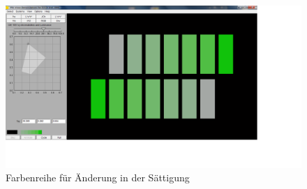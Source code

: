 \documentclass[a4paper]{article}
\begin{document}
\begin{figure}[H]
    \centering
    \includegraphics[width=\textwidth]{images/A5_Saettigung.png}
    \caption{Farbenreihe für Änderung in der Sättigung}
    \label{fig:A5c}
\end{figure}

\vspace{1.5\baselineskip}
\end{document}
